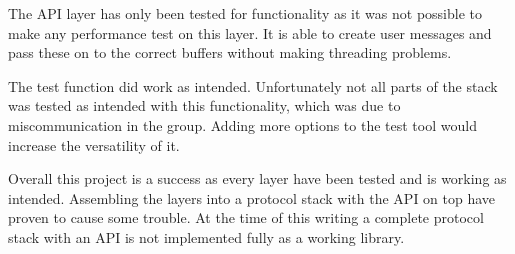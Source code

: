 
The API layer has only been tested for functionality as it was not possible to make any performance test on this layer. It is able to create user messages and pass these on to the correct buffers without making threading problems. %

The test function did work as intended. Unfortunately not all parts of the stack was tested as intended with this functionality, which was due to miscommunication in the group. Adding more options to the test tool would increase the versatility of it.

Overall this project is a success as every layer have been tested and is working as intended. Assembling the layers into a protocol stack with the API on top have proven to cause some trouble. At the time of this writing a complete protocol stack with an API is not implemented fully as a working library.
